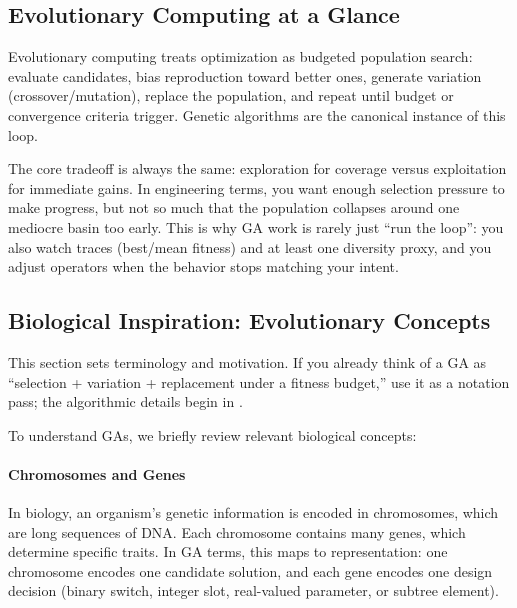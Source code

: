 \subsection{Evolutionary Computing at a Glance}
\label{sec:evo_introduction_to_evolutionary_computing}

Evolutionary computing treats optimization as budgeted population search: evaluate candidates, bias reproduction toward better ones, generate variation (crossover/mutation), replace the population, and repeat until budget or convergence criteria trigger. Genetic algorithms are the canonical instance of this loop.

The core tradeoff is always the same: exploration for coverage versus exploitation for immediate gains. In engineering terms, you want enough selection pressure to make progress, but not so much that the population collapses around one mediocre basin too early. This is why GA work is rarely just ``run the loop'': you also watch traces (best/mean fitness) and at least one diversity proxy, and you adjust operators when the behavior stops matching your intent.

\subsection{Biological Inspiration: Evolutionary Concepts}
\label{sec:evo_biological_inspiration_evolutionary_concepts}

This section sets terminology and motivation. If you already think of a GA as ``selection + variation + replacement under a fitness budget,'' use it as a notation pass; the algorithmic details begin in .

To understand GAs, we briefly review relevant biological concepts:

\paragraph{Chromosomes and Genes}
In biology, an organism's genetic information is encoded in chromosomes, which are long sequences of DNA. Each chromosome contains many genes, which determine specific traits.
In GA terms, this maps to representation: one chromosome encodes one candidate solution, and each gene encodes one design decision (binary switch, integer slot, real-valued parameter, or subtree element).

